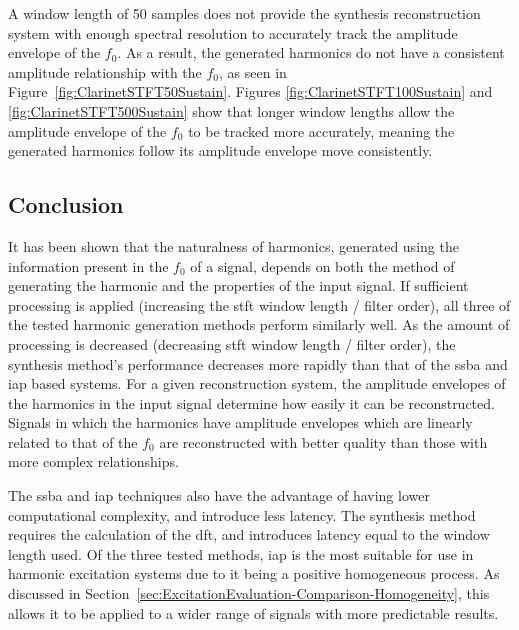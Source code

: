 			A window length of 50 samples does not provide the synthesis reconstruction system with enough
			spectral resolution to accurately track the amplitude envelope of the $f_{0}$. As a result, the
			generated harmonics do not have a consistent amplitude relationship with the $f_{0}$, as seen in
			Figure~\ref{fig:ClarinetSTFT50Sustain}. Figures \ref{fig:ClarinetSTFT100Sustain} and
			\ref{fig:ClarinetSTFT500Sustain} show that longer window lengths allow the amplitude envelope of
			the $f_{0}$ to be tracked more accurately, meaning the generated harmonics follow its amplitude
			envelope move consistently.
		
	\subsection{Conclusion}
	\label{sec:PerceptualExperiments-Reconstruction-Conclusion}
		It has been shown that the naturalness of harmonics, generated using the information present in the $f_{0}$
		of a signal, depends on both the method of generating the harmonic and the properties of the input signal.
		If sufficient processing is applied (increasing the \acrshort{stft} window length / filter order), all
		three of the tested harmonic generation methods perform similarly well. As the amount of processing is
		decreased (decreasing \acrshort{stft} window length / filter order), the synthesis method's performance
		decreases more rapidly than that of the \acrshort{ssba} and \acrshort{iap} based systems. For a given
		reconstruction system, the amplitude envelopes of the harmonics in the input signal determine how easily it
		can be reconstructed.  Signals in which the harmonics have amplitude envelopes which are linearly related
		to that of the $f_{0}$ are reconstructed with better quality than those with more complex relationships.
		
		The \acrshort{ssba} and \acrshort{iap} techniques also have the advantage of having lower computational
		complexity, and introduce less latency. The synthesis method requires the calculation of the
		\acrshort{dft}, and introduces latency equal to the window length used. Of the three tested methods,
		\acrshort{iap} is the most suitable for use in harmonic excitation systems due to it being a positive
		homogeneous process. As discussed in Section~\ref{sec:ExcitationEvaluation-Comparison-Homogeneity}, this
		allows it to be applied to a wider range of signals with more predictable results.

